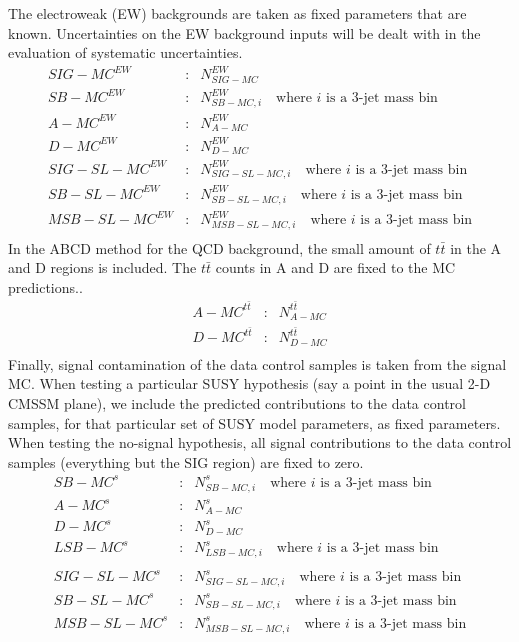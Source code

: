 \documentclass[11pt]{article}
\begin{document}
    \noindent
    The electroweak (EW) backgrounds are taken as fixed parameters that are
    known.  Uncertainties on the EW background inputs will be dealt with
    in the evaluation of systematic uncertainties.
    \begin{eqnarray*}
    SIG-MC^{EW} & : & N_{SIG-MC}^{EW} \\ 
    SB-MC^{EW} & : & N_{SB-MC,i}^{EW}  \quad \textrm {where $i$ is a 3-jet mass bin} \\ 
    A-MC^{EW} & : & N_{A-MC}^{EW} \\
    D-MC^{EW} & : & N_{D-MC}^{EW} \\ 
    SIG-SL-MC^{EW} & : & N_{SIG-SL-MC,i}^{EW}  \quad \textrm {where $i$ is a 3-jet mass bin} \\ 
    SB-SL-MC^{EW} & : & N_{SB-SL-MC,i}^{EW}  \quad \textrm {where $i$ is a 3-jet mass bin} \\ 
    MSB-SL-MC^{EW} & : & N_{MSB-SL-MC,i}^{EW}  \quad \textrm {where $i$ is a 3-jet mass bin} \\ 
    \end{eqnarray*}
    In the ABCD method for the QCD background, the small amount of $t\bar t$ in the
    A and D regions is included.
    The $t\bar t$ counts in A and D are fixed to the MC predictions..
    \begin{eqnarray*}
    A-MC^{t\bar t} & : & N_{A-MC}^{t\bar t} \\
    D-MC^{t\bar t} & : & N_{D-MC}^{t\bar t} \\
    \end{eqnarray*}
    Finally, signal contamination of the data control samples is taken from
    the signal MC.
    When testing a particular SUSY hypothesis (say a point in the usual 2-D CMSSM plane),
    we include the predicted contributions to the data control samples,
    for that particular set of SUSY model parameters,
    as fixed parameters.
    When testing the no-signal hypothesis, all signal contributions to the data control
    samples (everything but the SIG region) are fixed to zero.
    \begin{eqnarray*}
    SB-MC^{s} & : & N_{SB-MC,i}^{s} \quad \textrm {where $i$ is a 3-jet mass bin} \\ 
    A-MC^{s} & : & N_{A-MC}^{s} \\
    D-MC^{s} & : & N_{D-MC}^{s} \\ 
    LSB-MC^{s} & : & N_{LSB-MC,i}^{s} \quad \textrm {where $i$ is a 3-jet mass bin} \\ \\
    SIG-SL-MC^{s} & : & N_{SIG-SL-MC,i}^{s} \quad \textrm {where $i$ is a 3-jet mass bin} \\
    SB-SL-MC^{s} & : & N_{SB-SL-MC,i}^{s} \quad \textrm {where $i$ is a 3-jet mass bin} \\
    MSB-SL-MC^{s} & : & N_{MSB-SL-MC,i}^{s} \quad \textrm {where $i$ is a 3-jet mass bin} \\
    \end{eqnarray*}
    
\end{document}
